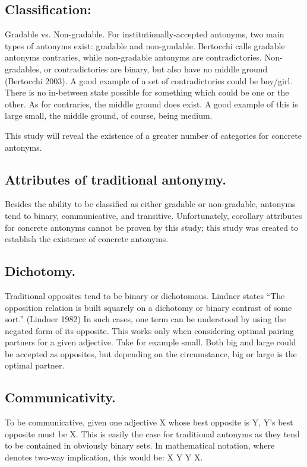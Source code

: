 \subsection {Classification:} Gradable vs. Non-gradable. For institutionally-accepted antonyms, two main types of antonyms exist: gradable and non-gradable. Bertocchi calls gradable antonyms contraries, while non-gradable antonyms are contradictories.   Non-gradables, or contradictories are binary, but also have no middle ground (Bertocchi 2003).  A good example of a set of contradictories could be boy/girl.  There is no in-between state possible for something which could be one or the other.  As for contraries, the middle ground does exist.  A good example of this is large \opp small, the middle ground, of course, being medium.  

This study will reveal the existence of a greater number of categories for concrete antonyms. 

\subsection {Attributes of traditional antonymy.} Besides the ability to be classified as either gradable or non-gradable, antonyms tend to binary, communicative, and transitive.  Unfortunately, corollary attributes for concrete antonyms cannot be proven by this study; this study was created to establish the existence of concrete antonyms.

\subsection {Dichotomy.} Traditional opposites tend to be binary or dichotomous.  Lindner states “The opposition relation is built squarely on a dichotomy or binary contrast of some sort.” (Lindner 1982) In such cases, one term can be understood by using the negated form of its opposite.  This works only when considering optimal pairing partners for a given adjective.  Take for example small.  Both big and large could be accepted as opposites, but depending on the circumstance, big or large is the optimal partner.

\subsection {Communicativity.} To be communicative, given one adjective X whose best opposite is Y, Y’s best opposite must be X.  This is easily the case for traditional antonyms as they tend to be contained in obviously binary sets. In mathematical notation, where  denotes two-way implication, this would be: X \opp Y  Y \opp X.

